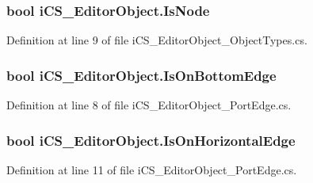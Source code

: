 \hypertarget{classi_c_s___editor_object_a5772fd8468e222452fad9408d25d045b}{
\subsubsection[{Is\+Node}]{\setlength{\rightskip}{0pt plus 5cm}bool i\+C\+S\+\_\+\+Editor\+Object.\+Is\+Node\hspace{0.3cm}{\ttfamily [get]}}}\label{classi_c_s___editor_object_a5772fd8468e222452fad9408d25d045b}


Definition at line 9 of file i\+C\+S\+\_\+\+Editor\+Object\+\_\+\+Object\+Types.\+cs.

\hypertarget{classi_c_s___editor_object_a21a22f3d8c44ce575a492ae67dd616b4}{
\subsubsection[{Is\+On\+Bottom\+Edge}]{\setlength{\rightskip}{0pt plus 5cm}bool i\+C\+S\+\_\+\+Editor\+Object.\+Is\+On\+Bottom\+Edge\hspace{0.3cm}{\ttfamily [get]}}}\label{classi_c_s___editor_object_a21a22f3d8c44ce575a492ae67dd616b4}


Definition at line 8 of file i\+C\+S\+\_\+\+Editor\+Object\+\_\+\+Port\+Edge.\+cs.

\hypertarget{classi_c_s___editor_object_a862573080098338a37871c8c8756c199}{
\subsubsection[{Is\+On\+Horizontal\+Edge}]{\setlength{\rightskip}{0pt plus 5cm}bool i\+C\+S\+\_\+\+Editor\+Object.\+Is\+On\+Horizontal\+Edge\hspace{0.3cm}{\ttfamily [get]}}}\label{classi_c_s___editor_object_a862573080098338a37871c8c8756c199}


Definition at line 11 of file i\+C\+S\+\_\+\+Editor\+Object\+\_\+\+Port\+Edge.\+cs.

